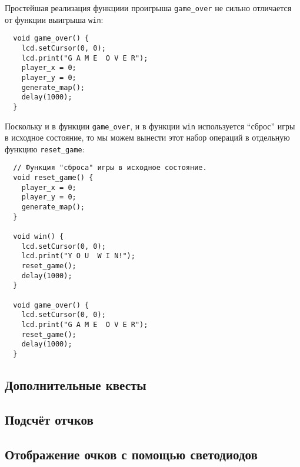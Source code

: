 \documentclass[../sparc.tex]{subfiles}
\begin{document}
Простейшая реализация функциии проигрыша \texttt{game\_over} не сильно
отличается от функции выигрыша \texttt{win}:

\begin{verbatim}
  void game_over() {
    lcd.setCursor(0, 0);
    lcd.print("G A M E  O V E R");
    player_x = 0;
    player_y = 0;
    generate_map();
    delay(1000);
  }
\end{verbatim}

Поскольку и в функции \texttt{game\_over}, и в функции \texttt{win} используется
``сброс'' игры в исходное состояние, то мы можем вынести этот набор операций в
отдельную функцию \texttt{reset\_game}:

\begin{verbatim}
  // Функция "сброса" игры в исходное состояние.
  void reset_game() {
    player_x = 0;
    player_y = 0;
    generate_map();
  }

  void win() {
    lcd.setCursor(0, 0);
    lcd.print("Y O U  W I N!");
    reset_game();
    delay(1000);
  }

  void game_over() {
    lcd.setCursor(0, 0);
    lcd.print("G A M E  O V E R");
    reset_game();
    delay(1000);
  }
\end{verbatim}

\subsection{Дополнительные квесты}

\subsection{Подсчёт отчков}

\subsection{Отображение очков с помощью светодиодов}
\end{document}
